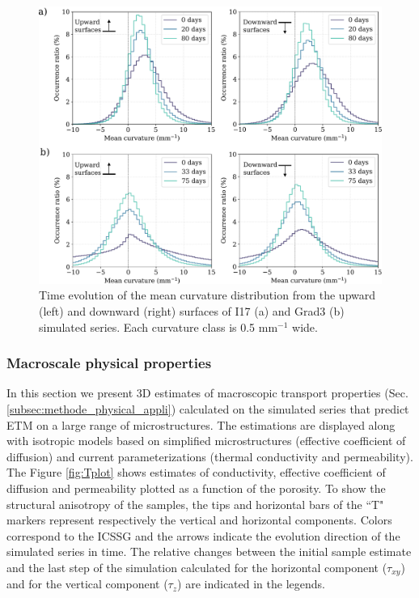 \documentclass[draft,ms]{agujournal2019}
\begin{document}
\begin{figure}
    \centering
    \includegraphics[width=\linewidth]{Figures/histo_i17_grad3.pdf}
    \caption{Time evolution of the mean curvature distribution from the upward (left) and downward (right) surfaces of I17 (a) and Grad3 (b) simulated series. Each curvature class is 0.5 mm$^{-1}$ wide.}
    \label{fig:histo_i17_grad3}
\end{figure}

\subsubsection{Macroscale physical properties}

In this section we present 3D estimates of macroscopic transport properties (Sec. \ref{subsec:methode_physical_appli}) calculated on the simulated series that predict ETM on a large range of microstructures. The estimations are displayed along with isotropic models based on simplified microstructures (effective coefficient of diffusion) and current parameterizations (thermal conductivity and permeability).
The Figure \ref{fig:Tplot} shows estimates of conductivity, effective coefficient of diffusion and permeability plotted as a function of the porosity. To show the structural anisotropy of the samples, the tips and horizontal bars of the ``T" markers represent respectively the vertical and horizontal components. Colors correspond to the ICSSG \cite{fierz2009international} and the arrows indicate the evolution direction of the simulated series in time. The relative changes between the initial sample estimate and the last step of the simulation calculated for the horizontal component ($\tau_{x y}$) and for the vertical component ($\tau_{z}$) are indicated in the legends.\\
 
\end{document}
